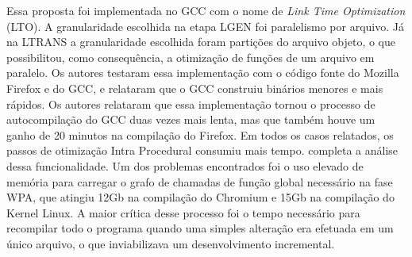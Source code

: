 Essa proposta foi implementada
no GCC \citep{glek2010optimizing} com o nome de
\textit{Link Time Optimization} (LTO). A granularidade
escolhida na etapa LGEN foi paralelismo por arquivo. Já na LTRANS a granularidade
escolhida foram partições do arquivo objeto, o que possibilitou, como
consequência, a otimização de funções de um arquivo em paralelo. Os autores
testaram essa implementação com o
código fonte do Mozilla Firefox e do GCC, e relataram que o GCC construiu
binários menores e mais rápidos. Os autores relataram que essa implementação tornou
o processo de autocompilação do GCC duas vezes mais lenta,
mas que também houve um ganho de 20 minutos na compilação do Firefox. Em todos os
casos relatados, os passos de otimização Intra Procedural consumiu mais tempo.
\cite{livska2014optimizing} completa a análise dessa funcionalidade.
Um dos problemas encontrados foi o uso elevado de memória para carregar o grafo de
chamadas de função global necessário na fase WPA, que atingiu 12Gb na compilação do
Chromium e 15Gb na compilação do Kernel Linux. A maior crítica desse processo
foi o tempo necessário para recompilar todo o programa quando uma simples alteração
era efetuada em um único arquivo, o que inviabilizava um desenvolvimento incremental.

